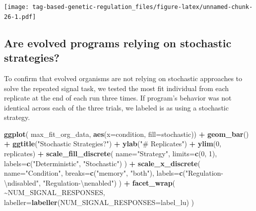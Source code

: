 \documentclass[
]{book}
\newenvironment{Shaded}{\begin{snugshade}}{\end{snugshade}}
\newcommand{\CharTok}[1]{\textcolor[rgb]{0.31,0.60,0.02}{#1}}
\newcommand{\DataTypeTok}[1]{\textcolor[rgb]{0.13,0.29,0.53}{#1}}
\newcommand{\DecValTok}[1]{\textcolor[rgb]{0.00,0.00,0.81}{#1}}
\newcommand{\KeywordTok}[1]{\textcolor[rgb]{0.13,0.29,0.53}{\textbf{#1}}}
\newcommand{\NormalTok}[1]{#1}
\newcommand{\OperatorTok}[1]{\textcolor[rgb]{0.81,0.36,0.00}{\textbf{#1}}}
\newcommand{\StringTok}[1]{\textcolor[rgb]{0.31,0.60,0.02}{#1}}
\begin{document}
\texttt{[image: tag-based-genetic-regulation\_files/figure-latex/unnamed-chunk-26-1.pdf]}

\hypertarget{are-evolved-programs-relying-on-stochastic-strategies}{%
\subsection{Are evolved programs relying on stochastic strategies?}\label{are-evolved-programs-relying-on-stochastic-strategies}}

To confirm that evolved organisms are not relying on stochastic approaches to solve the repeated signal task,
we tested the most fit individual from each replicate at the end of each run three times.
If program's behavior was not identical across each of the three trials, we labeled is as using a stochastic strategy.

\begin{Shaded}
\begin{Highlighting}[]
\KeywordTok{ggplot}\NormalTok{( max\_fit\_org\_data, }\KeywordTok{aes}\NormalTok{(}\DataTypeTok{x=}\NormalTok{condition, }\DataTypeTok{fill=}\NormalTok{stochastic)) }\OperatorTok{+}
\StringTok{  }\KeywordTok{geom\_bar}\NormalTok{() }\OperatorTok{+}
\StringTok{  }\KeywordTok{ggtitle}\NormalTok{(}\StringTok{"Stochastic Strategies?"}\NormalTok{) }\OperatorTok{+}
\StringTok{  }\KeywordTok{ylab}\NormalTok{(}\StringTok{"\# Replicates"}\NormalTok{) }\OperatorTok{+}
\StringTok{  }\KeywordTok{ylim}\NormalTok{(}\DecValTok{0}\NormalTok{, replicates) }\OperatorTok{+}
\StringTok{  }\KeywordTok{scale\_fill\_discrete}\NormalTok{(}
    \DataTypeTok{name=}\StringTok{"Strategy"}\NormalTok{,}
    \DataTypeTok{limits=}\KeywordTok{c}\NormalTok{(}\DecValTok{0}\NormalTok{, }\DecValTok{1}\NormalTok{),}
    \DataTypeTok{labels=}\KeywordTok{c}\NormalTok{(}\StringTok{"Deterministic"}\NormalTok{, }\StringTok{"Stochastic"}\NormalTok{)}
\NormalTok{  ) }\OperatorTok{+}
\StringTok{  }\KeywordTok{scale\_x\_discrete}\NormalTok{(}
    \DataTypeTok{name=}\StringTok{"Condition"}\NormalTok{,}
    \DataTypeTok{breaks=}\KeywordTok{c}\NormalTok{(}\StringTok{"memory"}\NormalTok{, }\StringTok{"both"}\NormalTok{),}
    \DataTypeTok{labels=}\KeywordTok{c}\NormalTok{(}\StringTok{"Regulation{-}}\CharTok{\textbackslash{}n}\StringTok{disabled"}\NormalTok{, }\StringTok{"Regulation{-}}\CharTok{\textbackslash{}n}\StringTok{enabled"}\NormalTok{)}
\NormalTok{  ) }\OperatorTok{+}
\StringTok{  }\KeywordTok{facet\_wrap}\NormalTok{(}
    \OperatorTok{\textasciitilde{}}\NormalTok{NUM\_SIGNAL\_RESPONSES,}
    \DataTypeTok{labeller=}\KeywordTok{labeller}\NormalTok{(}\DataTypeTok{NUM\_SIGNAL\_RESPONSES=}\NormalTok{label\_lu)}
\NormalTok{  )}
\end{Highlighting}
\end{Shaded}
\end{document}
